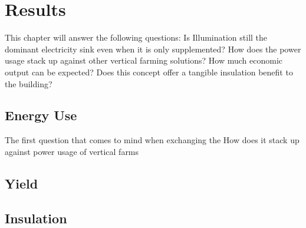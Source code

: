\chapter{Results}
\label{chap:results}
%
This chapter will answer the following questions:
Is Illumination still the dominant electricity sink even when it is only supplemented?
How does the power usage stack up against other vertical farming solutions?
How much economic output can be expected?
Does this concept offer a tangible insulation benefit to the building?

\section{Energy Use}
The first question that comes to mind when exchanging the 
How does it stack up against power usage of vertical farms

\section{Yield}

\section{Insulation}

